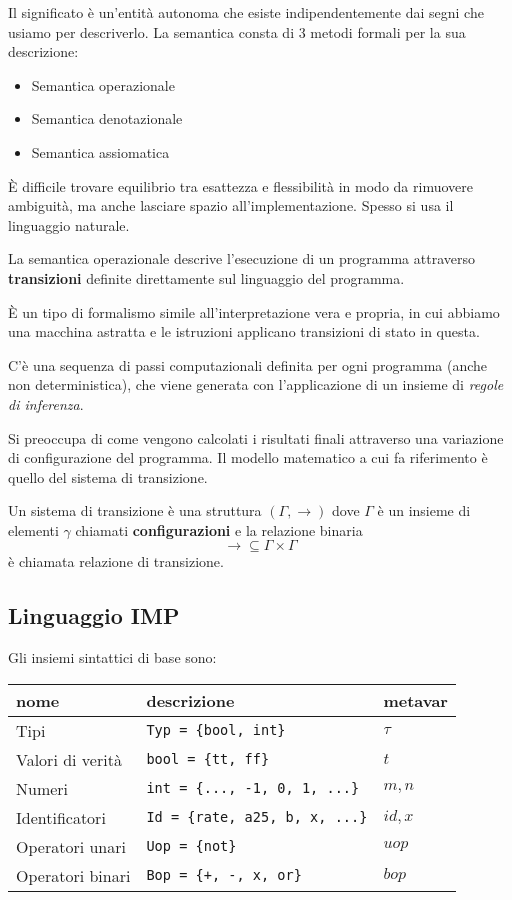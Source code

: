\documentclass[a4paper, 10pt]{article}
\begin{document}
\begin{enumerate}
		Il significato è un'entità autonoma che esiste indipendentemente dai segni che usiamo per descriverlo.
		La semantica consta di 3 metodi formali per la sua descrizione:
		\begin{itemize}
			\item Semantica operazionale
			\item Semantica denotazionale 
			\item Semantica assiomatica
		\end{itemize}
		È difficile trovare equilibrio tra esattezza e flessibilità in modo da rimuovere ambiguità, ma anche lasciare spazio all'implementazione. Spesso si usa il linguaggio naturale.
	\end{enumerate}
	
	La semantica operazionale descrive l'esecuzione di un programma attraverso \textbf{transizioni} definite direttamente sul linguaggio del programma.
	
	\noindent
	È un tipo di formalismo simile all'interpretazione vera e propria, in cui abbiamo una macchina astratta e le istruzioni applicano transizioni di stato in questa.
	
	\noindent
	C'è una sequenza di passi computazionali definita per ogni programma (anche non deterministica), che viene generata con l'applicazione di un insieme di \textit{regole di inferenza}.
	
	\noindent
	Si preoccupa di come vengono calcolati i risultati finali attraverso una variazione di configurazione del programma. Il modello matematico a cui fa riferimento è quello del sistema di transizione.
	
	Un sistema di transizione è una struttura $(\Gamma, \to)$ dove $\Gamma$ è un insieme di elementi $\gamma$ chiamati \textbf{configurazioni} e la relazione binaria 
	\[
	\to\subseteq \Gamma \times \Gamma
	\] 
	è chiamata relazione di transizione.
	
	\subsection{Linguaggio IMP}
	Gli insiemi sintattici di base sono:
	
	\vspace*{0.5cm}
	
	\begin{tabular}{lll}
		\toprule
		nome & descrizione & metavar \\
		\midrule
		Tipi & \lstinline|Typ = {bool, int}| &  $ \tau $ \\
		Valori di verità & \lstinline|bool = {tt, ff}| &  $ t $  \\
		Numeri & \lstinline|int = {..., -1, 0, 1, ...}| &  $ m, n $ \\
		Identificatori & \lstinline|Id = {rate, a25, b, x, ...}| &  $ id, x $ \\
		Operatori unari & \lstinline|Uop = {not}| &  $ uop $ \\
		Operatori binari & \lstinline|Bop = {+, -, x, or}| &  $ bop $ 
	\end{tabular}
	
\end{document}
